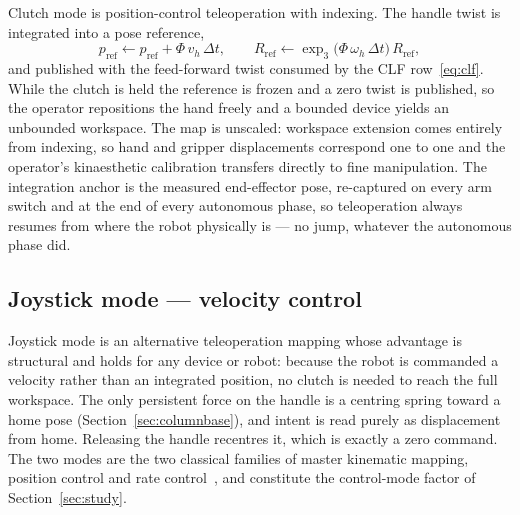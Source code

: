 \documentclass[12pt,a4paper,twoside,openright]{report}
\begin{document}
Clutch mode is position-control teleoperation with indexing. The handle twist is integrated into a pose reference,
\begin{equation}
p_{\text{ref}} \leftarrow p_{\text{ref}} + \Phi\, v_h\,\Delta t,
\qquad
R_{\text{ref}} \leftarrow \exp_3\!\bigl(\Phi\,\omega_h\,\Delta t\bigr)\, R_{\text{ref}},
\label{eq:clutchint}
\end{equation}
and published with the feed-forward twist consumed by the CLF row~\eqref{eq:clf}. While the clutch is held the reference is frozen and a zero twist is published, so the operator repositions the hand freely and a bounded device yields an unbounded workspace. The map is unscaled: workspace extension comes entirely from indexing, so hand and gripper displacements correspond one to one and the operator's kinaesthetic calibration transfers directly to fine manipulation. The integration anchor is the measured end-effector pose, re-captured on every arm switch and at the end of every autonomous phase, so teleoperation always resumes from where the robot physically is --- no jump, whatever the autonomous phase did.

\subsection{Joystick mode --- velocity control}
\label{sec:joystick}

Joystick mode is an alternative teleoperation mapping whose advantage is structural and holds for any device or robot: because the robot is commanded a velocity rather than an integrated position, no clutch is needed to reach the full workspace. The only persistent force on the handle is a centring spring toward a home pose (Section~\ref{sec:columnbase}), and intent is read purely as displacement from home. Releasing the handle recentres it, which is exactly a zero command. The two modes are the two classical families of master kinematic mapping, position control and rate control~\cite{kim1987comparison}, and constitute the control-mode factor of Section~\ref{sec:study}.
\end{document}
